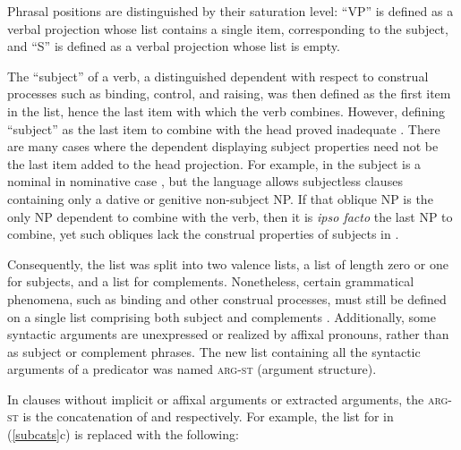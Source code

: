 \documentclass[output=paper
 	        ,biblatex
                ,babelshorthands
                ,newtxmath
                ,draftmode
                ,colorlinks, citecolor=brown
]{langscibook}
\begin{document}
\noindent
Phrasal positions are distinguished by their saturation level: ``VP'' is defined as a verbal
projection whose \subcat list contains a single item, corresponding to the subject, and ``S'' is
defined as a verbal projection whose \subcat list is empty.

The ``subject'' of a verb, a distinguished dependent with respect to
construal processes such as binding, control, and raising, was then defined as the first item in the
\subcat list, hence the last item with which the verb combines.  However, defining ``subject'' as
the last item to combine with the head proved inadequate \citep[Chapter~9]{pollard+sag:1994}.  There
are many cases where the dependent displaying subject properties need not be the last item added to
the head projection.  For example, in  the subject is a nominal in nominative case
\citep{Reis82}, but the language allows subjectless clauses containing only a dative or genitive
non-subject NP.  If that oblique NP is the only NP dependent to combine with
the verb, then it is \emph{ipso facto} the last NP to combine, yet such obliques lack the construal
properties of subjects in .

Consequently, the \subcat list was split into two valence lists, a \subj list of length zero or one
for subjects, and a \comps list for complements.  Nonetheless, certain grammatical phenomena, such
as binding and other construal processes, must still be defined on a single list comprising both
subject and complements \citep{Manning+Sag:1999}. Additionally, some syntactic arguments are
unexpressed or realized by affixal pronouns, rather than as subject or complement phrases.  The new
list containing all the syntactic arguments of a predicator was named \textsc{arg-st} (argument
structure).

In clauses without implicit or affixal arguments or extracted arguments, the \textsc{arg-st} is the
concatenation of  and  respectively.  For example, the \subcat list for
 in (\ref{subcats}c) is replaced with the following:

\begin{exe} 
	\label{put}
\ex
{}
\end{exe}
\end{document}
